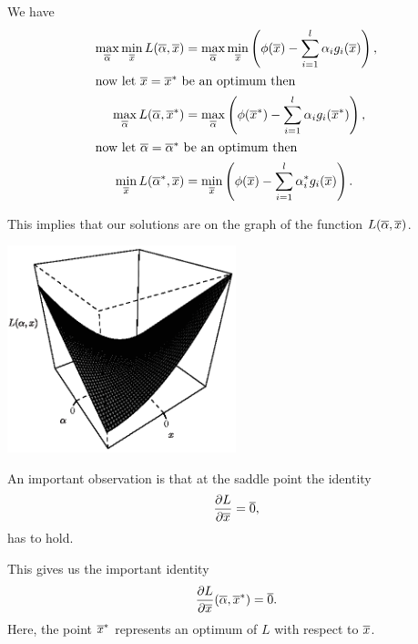\documentclass[a4paper,blends,pdf,colorBG,slideColor]{prosper}
\begin{document}
We have
\begin{align*}
\max_{\overline{\alpha}} \min_{\overline{x}} L(\overline{\alpha},\overline{x})& = \max_{\overline{\alpha}} \min_{\overline{x}}\left( \phi(\overline{x}) - \sum_{i=1}^l \alpha_i g_i(\overline{x})\right ),\\
\intertext{now let $\overline{x} = \overline{x}^*$ be an optimum then}
\max_{\overline{\alpha}} L(\overline{\alpha},\overline{x}^*) &= \max_{\overline{\alpha}} \left( \phi(\overline{x}^*) - \sum_{i=1}^l \alpha_i g_i(\overline{x}^*)\right ),\\
\intertext{now let $\overline{\alpha} = \overline{\alpha}^*$ be an optimum then}
\min_{\overline{x}} L(\overline{\alpha}^*,\overline{x}) &= \min_{\overline{x}} \left( \phi(\overline{x}) - \sum_{i=1}^l \alpha_i^* g_i(\overline{x})\right ) .
\end{align*}

\vspace{.2in}
This implies that our solutions are
 on the graph of the function $L(\overline{\alpha},\overline{x})$. 

\es


\vspace{.2in}

\begin{center}
\includegraphics[height=60mm]{figures/fig07-02.eps}
\end{center}
\es


An important observation is that at the saddle point the identity
\begin{equation*}
\frac{\partial L}{\partial \overline{x}} = \overline{0},
\end{equation*}
has to hold.

This gives us the important identity
\begin{equation*}
\frac{\partial L}{\partial \overline{x}} (\overline{\alpha},\overline{x}^*)= \overline{0}.
\end{equation*}
Here, the point $\overline{x}^*$ represents an optimum of $L$ with respect to $\overline{x}$.
\es
\end{document}
